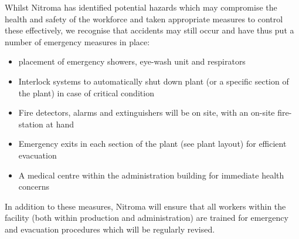 Whilst Nitroma has identified potential hazards which may compromise the health and safety of the workforce and taken appropriate measures to control these effectively, we recognise that accidents may still occur and have thus put a number of emergency measures in place:
 
\begin{itemize}
    \item placement of emergency showers, eye-wash unit and respirators
\item Interlock systems to automatically shut down plant (or a specific section of the plant) in case of critical condition 
\item Fire detectors, alarms and extinguishers will be on site, with an on-site fire-station at hand
    \item Emergency exits in each section of the plant (see plant layout) for efficient evacuation 
\item  A medical centre within the administration building for immediate health concerns
\end{itemize}

In addition to these measures, Nitroma will ensure that all workers within the facility (both within production and administration) are trained for emergency and evacuation procedures which will be regularly revised. 




 
